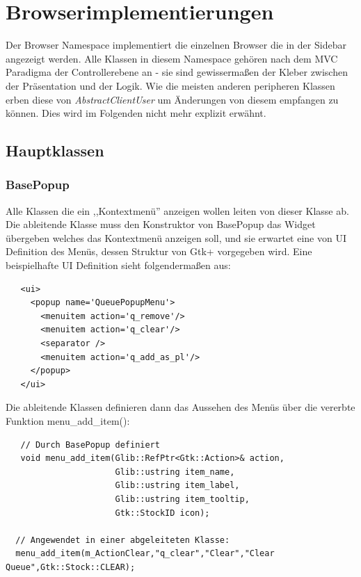 \section{Browserimplementierungen}

Der Browser Namespace implementiert die einzelnen Browser die in der Sidebar angezeigt werden.
Alle Klassen in diesem Namespace gehören nach dem MVC Paradigma der Controllerebene an - sie sind gewissermaßen der Kleber zwischen der Präsentation und der Logik.
Wie die meisten anderen peripheren Klassen erben diese von \emph{AbstractClientUser} um Änderungen von diesem empfangen zu können. Dies wird im Folgenden nicht mehr explizit erwähnt.

\subsection{Hauptklassen}
\subsubsection{BasePopup}

Alle Klassen die ein ,,Kontextmenü'' anzeigen wollen leiten von dieser Klasse ab.
Die ableitende Klasse muss den Konstruktor von BasePopup das Widget übergeben welches das Kontextmenü anzeigen soll, 
und sie erwartet eine von UI Definition des Menüs, dessen Struktur von Gtk+ vorgegeben wird.
Eine beispielhafte UI Definition sieht folgendermaßen aus:
\begin{verbatim}
   <ui>
     <popup name='QueuePopupMenu'>
       <menuitem action='q_remove'/>
       <menuitem action='q_clear'/>
       <separator />
       <menuitem action='q_add_as_pl'/>
     </popup>
   </ui>
\end{verbatim}

Die ableitende Klassen definieren dann das Aussehen des Menüs über die vererbte Funktion menu\_add\_item():
\begin{verbatim}
   // Durch BasePopup definiert
   void menu_add_item(Glib::RefPtr<Gtk::Action>& action,
                      Glib::ustring item_name,
                      Glib::ustring item_label,
                      Glib::ustring item_tooltip,
                      Gtk::StockID icon);
                      
  // Angewendet in einer abgeleiteten Klasse:
  menu_add_item(m_ActionClear,"q_clear","Clear","Clear Queue",Gtk::Stock::CLEAR);
\end{verbatim} 

